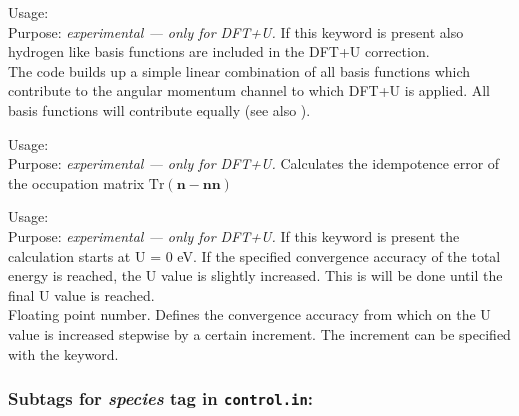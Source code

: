 {
  \noindent
  Usage:  \\[1.0ex]
  Purpose: \emph{experimental --- only for DFT+U.} If this keyword is present also hydrogen like basis functions
     are included in the DFT+U correction. \\[1.0ex]
     The code builds up a simple linear combination of all basis functions which contribute
     to the angular momentum channel to which DFT+U is applied. All basis functions will 
     contribute equally (see also ).\\
}

{
  \noindent
  Usage:  \\[1.0ex]
  Purpose: \emph{experimental --- only for DFT+U.} Calculates the idempotence error of the occupation matrix 
     $\mathrm{Tr}\left(\mathbf{n} - \mathbf{n}\mathbf{n}\right)$ \\[1.0ex]
}

{
  \noindent
  Usage:   \\[1.0ex]
  Purpose: \emph{experimental --- only for DFT+U.} If this keyword is present the calculation starts at U = 0 eV.
     If the specified convergence accuracy of the total energy is reached, the U value is slightly increased. 
     This is will be done until the final U value is reached.  \\[1.0ex]
      Floating point number. Defines the convergence accuracy from which on the U value
     is increased stepwise by a certain increment. The increment can be specified with the
      keyword.\\
     
}
\subsubsection*{Subtags for \emph{species} tag in \texttt{control.in}:}

